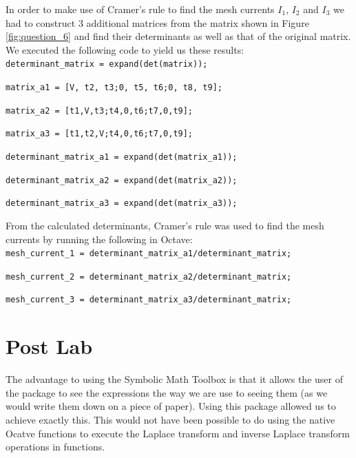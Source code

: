 \documentclass[12pt, a4paper]{article}
\begin{document}
	In order to make use of Cramer's  rule to find the mesh currents $I_1$, $I_2$ and $I_3$ we had to construct 3 additional matrices from the matrix shown in Figure \ref{fig:question_6} and find their determinants as well as that of the original matrix. We executed the following code to yield us these results:\\

	\texttt{determinant\_matrix = expand(det(matrix));}\par

	
  	\texttt{matrix\_a1 = [V, t2, t3;0, t5, t6;0, t8, t9];}\par
  	\texttt{matrix\_a2 = [t1,V,t3;t4,0,t6;t7,0,t9];}\par
  	\texttt{matrix\_a3 = [t1,t2,V;t4,0,t6;t7,0,t9];}\par

  	\texttt{determinant\_matrix\_a1 = expand(det(matrix\_a1));}\par
  	\texttt{determinant\_matrix\_a2 = expand(det(matrix\_a2));}\par
  	\texttt{determinant\_matrix\_a3 = expand(det(matrix\_a3));}\par

  	From the calculated determinants, Cramer's rule was used to find the mesh currents by running the following in Octave:\\

  	\texttt{mesh\_current\_1 =  determinant\_matrix\_a1/determinant\_matrix;}\par
	\texttt{mesh\_current\_2 =  determinant\_matrix\_a2/determinant\_matrix;}\par
	\texttt{mesh\_current\_3 =  determinant\_matrix\_a3/determinant\_matrix;}\par

	\section{Post Lab}
	The advantage to using the Symbolic Math Toolbox is that it allows the user of the package to see the expressions the way we are use to seeing them (as we would write them down on a piece of paper). Using this package allowed us to achieve exactly this. This would not have been possible to do using the native Ocatve functions to execute the Laplace transform and inverse Laplace transform operations in functions. 
\end{document}
